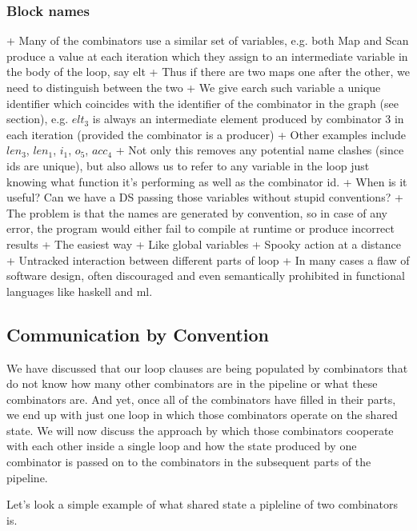 \documentclass[preamble.tex]{subfiles}
\begin{document}
\subsubsection{Block names}


+ Many of the combinators use a similar set of variables, e.g. both Map and Scan produce a value at each iteration which they assign to an intermediate variable in the body of the loop, say elt
+ Thus if there are two maps one after the other, we need to distinguish between the two
+ We give earch such variable a unique identifier which coincides with the identifier of the combinator in the graph (see section), e.g. $elt_3$ is always an intermediate element produced by combinator 3 in each iteration (provided the combinator is a producer)
+ Other examples include $len_3$, $len_1$, $i_1$, $o_5$, $acc_4$
+ Not only this removes any potential name clashes (since ids are unique), but also allows us to refer to any variable in the loop just knowing what function it's performing as well as the combinator id.
+ When is it useful? Can we have a DS passing those variables without stupid conventions?
+ The problem is that the names are generated by convention, so in case of any error, the program would either fail to compile at runtime or produce incorrect results
+ The easiest way 
+ Like global variables
+ Spooky action at a distance
+ Untracked interaction between different parts of loop
+ In many cases a flaw of software design, often discouraged and even semantically prohibited in functional languages like haskell and ml.



\subsection{Communication by Convention}

We have discussed that our loop clauses are being populated by combinators that do not know how many other combinators are in the pipeline or what these combinators are. And yet, once all of the combinators have filled in their parts, we end up with just one loop in which those combinators operate on the shared state. We will now discuss the approach by which those combinators cooperate with each other inside a single loop and how the state produced by one combinator is passed on to the combinators in the subsequent parts of the pipeline.

Let's look a simple example of what shared state a pipleline of two combinators  is.
\end{document}
